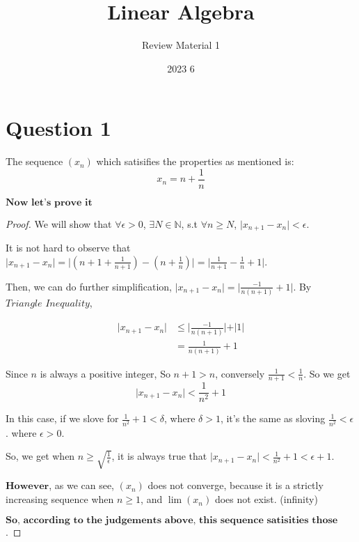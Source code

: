 \documentclass[12pt]{article}
\title{Linear Algebra}
\author{Review Material 1}
\date{2023 6}
\begin{document}
\doublespacing

\section*{Question 1}

The sequence $(x_n)$ which satisifies the properties 
as mentioned is: 
\[ x_n = n + \frac{1}{n} \]

\begin{center}
    $\textbf{Now let's prove it}$
\end{center}

\begin{proof}
    We will show that $\forall \epsilon > 0$, $\exists N
    \in \mathbb{N}$, s.t $\forall n \geq N$,
    $\vert x_{n+1} - x_n \vert < \epsilon$.

    \vspace*{0.4cm}
    It is not hard to observe that $\displaystyle{
    \vert x_{n+1} - x_n \vert = \Bigg| \left( n +1+
    \frac{1}{n+1} \right) - \left(n + \frac{1}{n}\right)}
    \Bigg| = \Bigg| \frac{1}{n+1} - \frac{1}{n} + 1 \Bigg|$.

    \vspace*{0.5cm}
    Then, we can do further simplification,
    $\displaystyle{\vert x_{n+1} - x_n \vert = \Bigg| \frac{-1}{n(n+1)}
    + 1 \Bigg| } $. By $\textit{Triangle Inequality}$,
    
    \begin{align*}
    \vert x_{n+1} - x_n \vert &\leq 
    \Bigg| \frac{-1}{n(n+1)}  \Bigg|+  \vert 1 \vert \\
    &= \displaystyle{\frac{1}{n(n+1)} + 1}
    \end{align*}

    Since $n$ is always a positive integer, So
    $n+1 > n$, conversely $\displaystyle{\frac{1}{n+1}
    < \frac{1}{n}}$. So we get
    \[ \vert x_{n+1} - x_n \vert <
    \frac{1}{n^2} + 1\]

    In this case, if we slove for $\displaystyle{
    \frac{1}{n^2} + 1 < \delta}$, where $\delta >1$,
    it's the same as sloving $\displaystyle\frac{1}{n^2} <
    \epsilon$. where $\epsilon > 0$.

    So, we get when $n \geq \displaystyle{
    \sqrt{\frac{1}{\epsilon}}}$, it is always true that
    $\displaystyle{\vert x_{n+1} - x_{n} \vert 
    < \frac{1}{n^2} + 1 < \epsilon + 1}$. 

    \vspace*{0.3cm}
    $\textbf{However}$, as we can see, $(x_n)$ does
    not converge, because it is a strictly increasing
    sequence when $n \geq 1$, and $\lim(x_n)$ does not
    exist. (infinity)

    \vspace*{0.6cm}
    $\textbf{So, according to the judgements above,
    this sequence satisities those properties}$.

\end{proof}
\end{document}
